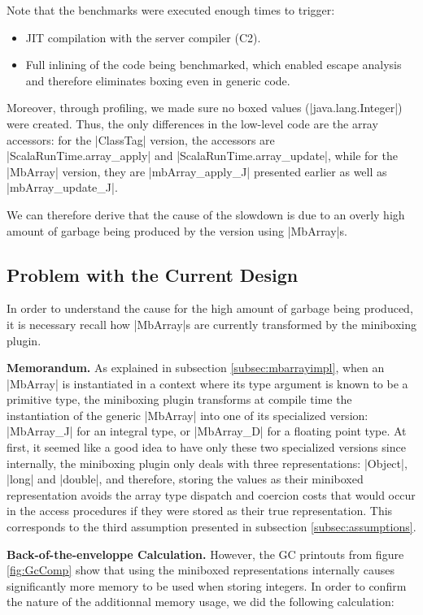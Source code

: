 Note that the benchmarks were executed enough times to trigger:
\begin{itemize}
  \item JIT compilation with the server compiler (C2).
  \item Full inlining of the code being benchmarked, which enabled escape analysis and therefore eliminates boxing even in generic code.
\end{itemize}

Moreover, through profiling, we made sure no boxed values (|java.lang.Integer|) were created.
Thus, the only differences in the low-level code are the array accessors: for the |ClassTag| version, the accessors are |ScalaRunTime.array_apply| and |ScalaRunTime.array_update|, while for the |MbArray| version, they are |mbArray_apply_J| presented earlier as well as |mbArray_update_J|.

We can therefore derive that the cause of the slowdown is due to an overly high amount of garbage being produced by the version using |MbArray|s.

\subsection{Problem with the Current Design}

In order to understand the cause for the high amount of garbage being produced, it is necessary recall how |MbArray|s are currently transformed by the miniboxing plugin. 

\textbf{Memorandum.} As explained in subsection \ref{subsec:mbarrayimpl}, when an |MbArray| is instantiated in a context where its type argument is known to be a primitive type, the miniboxing plugin transforms at compile time the instantiation of the generic |MbArray| into one of its specialized version: |MbArray_J| for an integral type, or |MbArray_D| for a floating point type.
At first, it seemed like a good idea to have only these two specialized versions since internally, the miniboxing plugin only deals with three representations: |Object|, |long| and |double|, and therefore, storing the values as their miniboxed representation avoids the array type dispatch and coercion costs that would occur in the access procedures if they were stored as their true representation. This corresponds to the third assumption presented in subsection \ref{subsec:assumptions}.

\textbf{Back-of-the-enveloppe Calculation.} However, the GC printouts from figure \ref{fig:GcComp} show that using the miniboxed representations internally causes significantly more memory to be used when storing integers. In order to confirm the nature of the additionnal memory usage, we did the following calculation:

